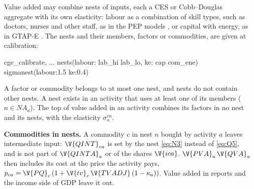 Value added may combine nests of inputs, each a CES or Cobb--Douglas aggregate
with its own elasticity: labour as a combination of skill types, such as
doctors, nurses and other staff, as in the PEP models \citep{decaluwe2013}, or
capital with energy, as in GTAP-E \citep{burniaux2002}. The nests and their
members, factors or commodities, are given at calibration:
\begin{stcode}
cge_calibrate, ... nests(labour: lab_hi lab_lo, ke: cap com_ene) sigmanest(labour:1.5 ke:0.4)
\end{stcode}
A factor or commodity belongs to at most one nest, and nests do not contain
other nests. A nest exists in an activity that uses at least one of its
members ($n \in NA_a$). The top of value added in an activity combines its
factors in no nest and its nests, with the elasticity $\sigma^{va}_a$.

\textbf{Commodities in nests.} A commodity $c$ in nest $n$ bought by activity
$a$ leaves intermediate input: $\V{QINT}_{ca}$ is set by the nest
\eqref{eq:N3} instead of \eqref{eq:Q5}, and is not part of $\V{QINTA}_a$ or of
the shares $\V{ica}$. $\V{PVA}_a\,\V{QVA}_a$ then includes its cost at the
price the activity pays, $p_{ca} = \V{PQ}_c\,(1 + \V{tv}_c\,\V{TVADJ}\,(1 -
\kappa_a))$. Value added in reports and the income side of GDP leave it out.

